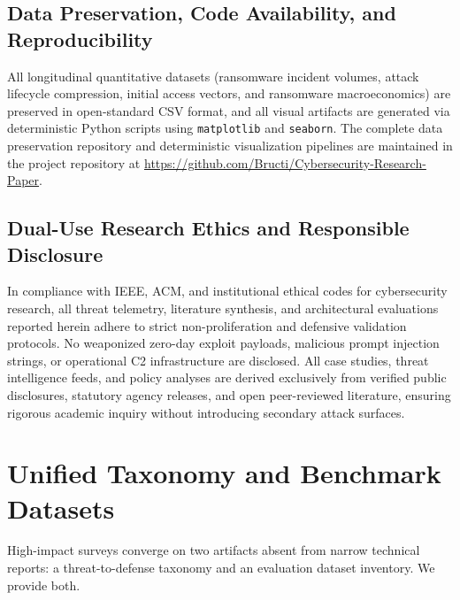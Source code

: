 \documentclass[conference,10pt,twocolumn,a4paper]{IEEEtran}
\begin{document}
\subsection{Data Preservation, Code Availability, and Reproducibility}
All longitudinal quantitative datasets (ransomware incident volumes, attack lifecycle compression, initial access vectors, and ransomware macroeconomics) are preserved in open-standard CSV format, and all visual artifacts are generated via deterministic Python scripts using \texttt{matplotlib} and \texttt{seaborn}. The complete data preservation repository and deterministic visualization pipelines are maintained in the project repository at \url{https://github.com/Bructi/Cybersecurity-Research-Paper}.

\subsection{Dual-Use Research Ethics and Responsible Disclosure}
In compliance with IEEE, ACM, and institutional ethical codes for cybersecurity research, all threat telemetry, literature synthesis, and architectural evaluations reported herein adhere to strict non-proliferation and defensive validation protocols. No weaponized zero-day exploit payloads, malicious prompt injection strings, or operational C2 infrastructure are disclosed. All case studies, threat intelligence feeds, and policy analyses are derived exclusively from verified public disclosures, statutory agency releases, and open peer-reviewed literature, ensuring rigorous academic inquiry without introducing secondary attack surfaces.

\section{Unified Taxonomy and Benchmark Datasets}
\label{sec:taxonomy}
High-impact surveys converge on two artifacts absent from narrow technical reports: a threat-to-defense taxonomy and an evaluation dataset inventory. We provide both.
\end{document}
